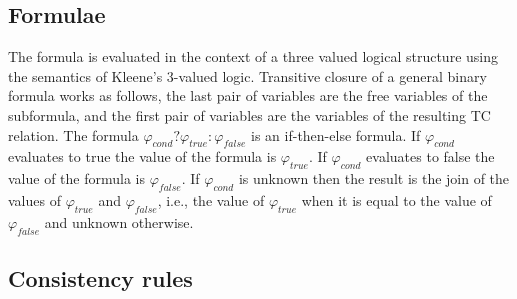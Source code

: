 \subsection{\label{Se:FormulaeMan}Formulae}

The formula is evaluated in the context of a three valued logical
structure using the semantics of Kleene's $3$-valued logic.
Transitive closure of a general binary formula works as follows,
the last pair of variables are the free variables of the
subformula, and the first pair of variables are the variables of
the resulting TC relation.  The formula $\varphi_{cond} ?
\varphi_{true} : \varphi_{false}$ is an if-then-else formula. If
$\varphi_{cond}$ evaluates to true the value of the formula is
$\varphi_{true}$. If $\varphi_{cond}$ evaluates to false the value
of the formula is $\varphi_{false}$. If $\varphi_{cond}$ is
unknown then the result is the join of the values of
$\varphi_{true}$ and $\varphi_{false}$, i.e., the value of
$\varphi_{true}$ when it is equal to the value of
$\varphi_{false}$ and unknown otherwise.

\subsection{Consistency rules}

